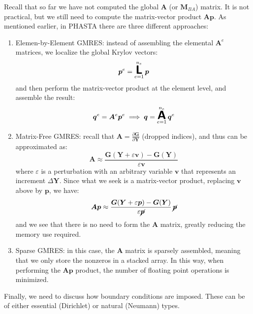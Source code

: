 \documentclass{ucb}
\begin{document}
Recall that so far we have not computed the global $\bm{A}$ (or $\bm{M}_{BA}$) matrix. It is not practical, but we still need to compute the matrix-vector product $\bm{A}\bm{p}$. As mentioned earlier, in PHASTA there are three different approaches:
\begin{enumerate}
    \item Elemen-by-Element GMRES: instead of assembling the elemental $\bm{A}^e$ matrices, we localize the global Krylov vectors:
    \begin{equation}
        \bm{p}^e = \Localize_{e = 1}^{n_e} \bm{p}
    \end{equation}
    and then perform the matrix-vector product at the element level, and assemble the result:
    \begin{equation}
        \bm{q}^e = \bm{A}^e \bm{p}^e \implies \bm{q} = \Assembly_{e = 1}^{n_e} \bm{q}^e
    \end{equation}
    
    \item Matrix-Free GMRES: recall that $\bm{A} = \frac{\partial\bm{G}}{\partial\bm{Y}}$ (dropped indices), and thus can be approximated as:
    \begin{equation}
        \bm{A} \approx \frac{\bm{G}(\bm{Y} + \varepsilon\bm{v}) - \bm{G}(\bm{Y})}{\varepsilon\bm{v}}
    \end{equation}
    where $\varepsilon$ is a perturbation with an arbitrary variable $\bm{v}$ that represents an increment $\Delta\bm{Y}$. Since what we seek is a matrix-vector product, replacing $\bm{v}$ above by $\bm{p}$, we have:
    \begin{equation}
        \bm{A}\bm{p} \approx \frac{\bm{G}(\bm{Y} + \varepsilon\bm{p}) - \bm{G}(\bm{Y})}{\varepsilon\cancel{\bm{p}}}\,\cancel{\bm{p}}
    \end{equation}
    and we see that there is no need to form the $\bm{A}$ matrix, greatly reducing the memory use required.
    
    \item Sparse GMRES: in this case, the $\bm{A}$ matrix is sparsely assembled, meaning that we only store the nonzeros in a stacked array. In this way, when performing the $\bm{A}\bm{p}$ product, the number of floating point operations is minimized.
\end{enumerate}

Finally, we need to discuss how boundary conditions are imposed. These can be of either essential (Dirichlet) or natural (Neumann) types.
\end{document}
